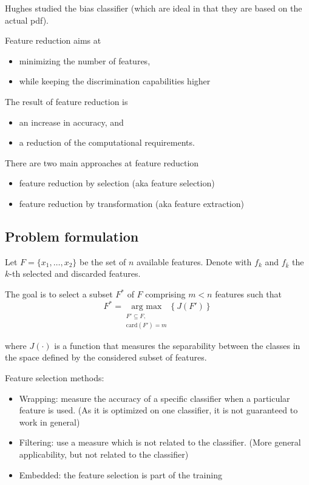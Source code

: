 \documentclass[oneside,onecolumn]{report}
\begin{document}
Hughes studied the bias classifier (which are ideal in that they are based on the actual pdf).

Feature reduction aims at
\begin{itemize}
    \item minimizing the number of features,
    \item while keeping the discrimination capabilities higher
\end{itemize}

The result of feature reduction is
\begin{itemize}
    \item an increase in accuracy, and
    \item a reduction of the computational requirements.
\end{itemize}

There are two main approaches at feature reduction
\begin{itemize}
    \item feature reduction by selection (aka feature selection)
    \item feature reduction by transformation (aka feature extraction)
\end{itemize}

\subsection{Problem formulation}
Let $F = \{ x_1, \dots, x_2 \}$ be the set of $n$ available features.
Denote with $f_k$ and $f_{\overline k}$ the $k$-th selected and discarded features.

The goal is to select a subset $F^*$ of $F$ comprising $m < n$ features such that
$$ F^* =\underset{\substack{ F' \subseteq F, \\  \text{card}(F') = m}}{\text{arg max}} \left\{ J(F') \right\} $$

where $J(\cdot)$ is a function that measures the separability between the classes in the space defined by the considered subset of features.

Feature selection methods:
\begin{itemize}
    \item Wrapping: measure the accuracy of a specific classifier when a particular feature is used. (As it is optimized on one classifier, it is not guaranteed to work in general)
    \item Filtering: use a measure which is not related to the classifier. (More general applicability, but not related to the classifier)
    \item Embedded: the feature selection is part of the training
\end{itemize}
\end{document}
